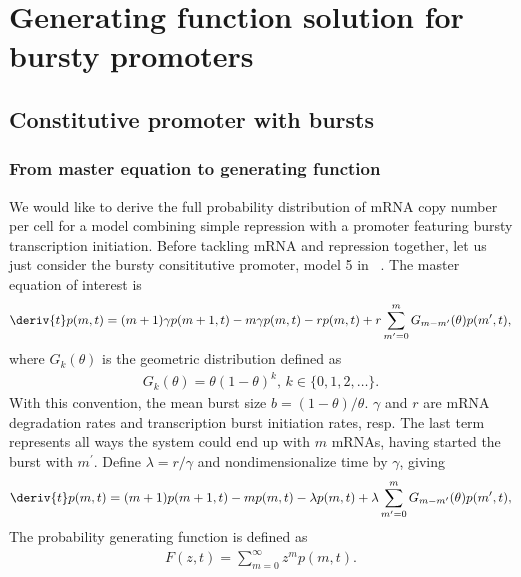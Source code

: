\section{Generating function solution for bursty promoters}

\subsection{Constitutive promoter with bursts}

\subsubsection{From master equation to generating function}

We would like to derive the full probability distribution of
mRNA copy number per cell for a model combining simple repression
with a promoter featuring bursty transcription initiation.
Before tackling mRNA and repression together, let us
just consider the bursty consititutive promoter,
model 5 in~
.
The master equation of interest is
\begin{align}
\deriv{t}p(m,t) = (m+1)\gamma p(m+1,t) - m\gamma p(m,t) - r p(m,t)
        + r \sum_{m^\prime=0}^m G_{m-m^\prime}(\theta) p(m^\prime,t),
\label{eq:1state_unreg_003}
\end{align}
where $G_{k}(\theta)$ is the geometric distribution defined as
\begin{align}
G_{k}(\theta) = \theta(1 - \theta)^k, \, k\in\{0,1,2,\dots\}.
\end{align}
With this convention, the mean burst size $b = (1-\theta)/\theta$.
$\gamma$ and $r$ are mRNA degradation rates and transcription burst
initiation rates, resp. The last term represents all ways the system could
end up with $m$ mRNAs, having started the burst with $m^\prime$. Define
$\lambda = r/\gamma$ and nondimensionalize time by $\gamma$, giving
\begin{align}
\deriv{t}p(m,t) = (m+1)p(m+1,t) - m p(m,t) - \lambda p(m,t)
        + \lambda \sum_{m^\prime=0}^m G_{m-m^\prime}(\theta) p(m^\prime,t),
\end{align}
The probability generating function is defined as
\begin{align}
F(z,t) = \sum_{m=0}^\infty z^m p(m,t).
\end{align}
